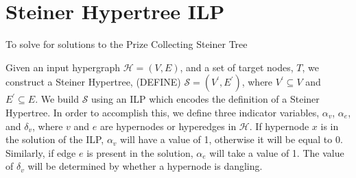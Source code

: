 \documentclass[12pt,twoside]{reedthesis}
\theoremstyle{definition}
\begin{document}
%

\section{Steiner Hypertree ILP}

To solve for solutions to the Prize Collecting Steiner Tree

Given an input hypergraph $\mathcal{H}=(V,E)$, and a set of target nodes, $T$, we construct a Steiner Hypertree, (DEFINE) $\mathcal{S}= (V^\prime,E^\prime)$, where $V^\prime \subseteq V$ and $E^\prime \subseteq E$.  We build $\mathcal{S}$ using an ILP which encodes the definition of a Steiner Hypertree.  In order to accomplish this, we define three indicator variables, $\alpha_v$, $\alpha_e$, and $\delta_v$, where $v$ and $e$ are hypernodes or hyperedges in $\mathcal{H}$.  If hypernode $x$ is in the solution of the ILP, $\alpha_v$ will have a value of 1, otherwise it will be equal to 0.  Similarly, if edge $e$ is present in the solution, $\alpha_e$ will take a value of 1. The value of $\delta_v$ will be determined by whether a hypernode is dangling.\par
\end{document}
